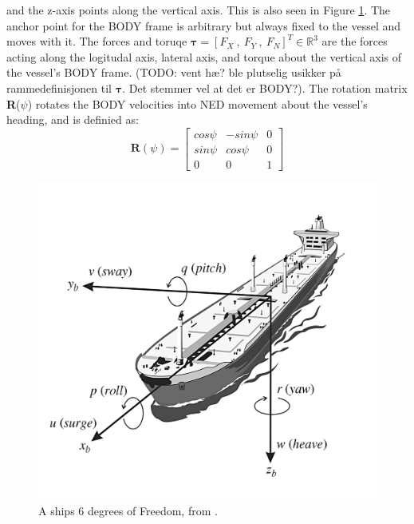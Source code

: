 and the z-axis points along the vertical axis. This is also seen in Figure \ref{FIG: Ship DOF}.
The anchor point for the BODY frame is arbitrary but always fixed to the vessel and moves with it. 
The forces and toruqe $\bm{\tau} = [F_{X}\ , \ F_{Y} \ , \ F_{N}]^T \in \mathbb{R}^{3}$ are the forces acting along
the logitudal axis, lateral axis, and torque about the vertical axis of the vessel's BODY frame. (TODO: vent hæ? ble plutselig usikker på rammedefinisjonen
til $\bm{\tau}$. Det stemmer vel at det er BODY?). The rotation matrix \textbf{R}($\psi$) rotates the BODY velocities into \gls{NED} movement about the
vessel's heading, and is definied as:
\begin{equation}
    \textbf{R}(\psi) = \begin{bmatrix}
                        cos\psi &   -sin\psi & 0\\[-5pt]
                        sin\psi & cos\psi    & 0\\[-5pt]
                        0       &   0        & 1
                        \end{bmatrix}
\end{equation}


\begin{figure}[ht]
    \centering
    \includegraphics[height=0.35\textheight]{Images/SHIPDOF_FOSSEN.png}
    \caption{A ships 6 degrees of Freedom, from \cite{fossen2011handbook}.} %
    \label{FIG: Ship DOF}
\end{figure}


